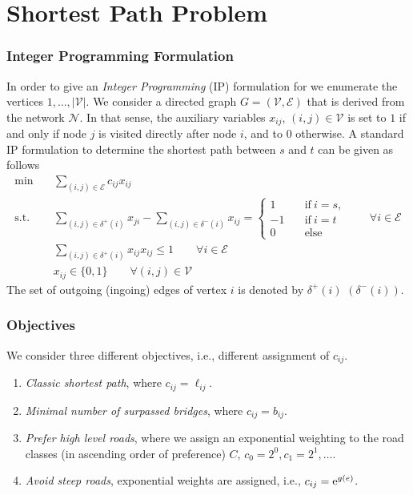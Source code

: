 \section{Shortest Path Problem}


\subsubsection{Integer Programming Formulation}
In order to give an \emph{Integer Programming} (IP) formulation for we enumerate the
vertices $1,\ldots,|\mathcal{V}|$. We consider a directed graph $G=(\mathcal{V},\mathcal{E})$ that is derived from the network $\mathcal{N}$.
In that sense, the auxiliary variables $x_{ij}$, $(i,j) \in \mathcal{V}$
is set to $1$ if and only if node $j$ is visited directly after node $i$, and to $0$ otherwise.
A standard IP formulation to determine the shortest path between $s$ and $t$ can be given as follows
\begin{align}
  \min \quad &\sum_{(i,j)\in \mathcal{E}}  c_{ij} x_{ij} \label{obj} \\
  \text{s.t.}\quad &
  \sum_{(i,j)\in \delta^{+} (i)} x_{ji} - \sum_{(i,j)\in \delta^{-}(i)} x_{ij} =
  \begin{cases}
    1 \quad& \text{if}~ i=s, \\
    -1 \quad& \text{if}~ i=t \\
    0 \quad&\text{else}
  \end{cases}
  \qquad \forall i \in \mathcal{E}
  \\
  &  \sum_{(i,j)\in \delta^{+} (i)} x_{ij}   x_ {ij} \leq 1     \qquad \forall i \in \mathcal{E}\\
  &  x_{ij} \in \{0,1\}   \qquad \forall (i,j) \in \mathcal{V}
\end{align}
The set of outgoing (ingoing) edges of vertex $i$ is denoted by  $\delta^{+} (i)$  $(\delta^{-} (i))$.


\subsubsection{Objectives}

We consider three different objectives, i.e., different assignment of $c_{ij}$.
\begin{enumerate}
  \item \emph{Classic shortest path}, where $c_{ij}=\ell_{ij}$. \label{obj_short}
  \item \emph{Minimal number of surpassed bridges}, where  $c_{ij}=b_{ij}$.  \label{obj_minBridge}
  \item \emph{Prefer high level roads}, where we assign an exponential weighting to the road classes (in ascending order of preference) $C$, $c_0=2^0,c_1=2^1, \ldots$.  \label{obj_highLevelRoad}
  \item \emph{Avoid steep roads}, exponential weights are assigned, i.e., $c_{ij}=\mathrm{e}^{g(e)}$.
  \label{obj_steep}
\end{enumerate}


